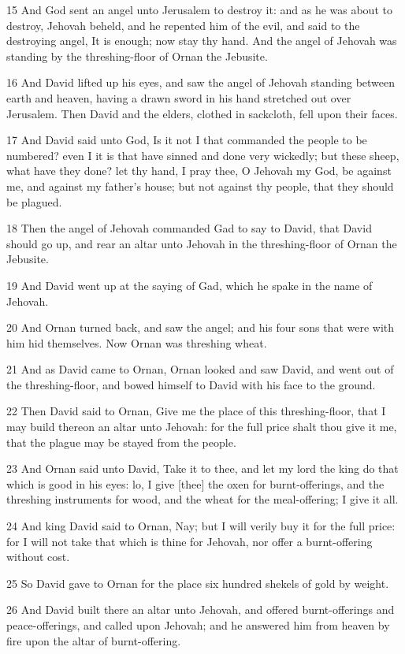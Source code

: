 \par 15 And God sent an angel unto Jerusalem to destroy it: and as he was about to destroy, Jehovah beheld, and he repented him of the evil, and said to the destroying angel, It is enough; now stay thy hand. And the angel of Jehovah was standing by the threshing-floor of Ornan the Jebusite.
\par 16 And David lifted up his eyes, and saw the angel of Jehovah standing between earth and heaven, having a drawn sword in his hand stretched out over Jerusalem. Then David and the elders, clothed in sackcloth, fell upon their faces.
\par 17 And David said unto God, Is it not I that commanded the people to be numbered? even I it is that have sinned and done very wickedly; but these sheep, what have they done? let thy hand, I pray thee, O Jehovah my God, be against me, and against my father's house; but not against thy people, that they should be plagued.
\par 18 Then the angel of Jehovah commanded Gad to say to David, that David should go up, and rear an altar unto Jehovah in the threshing-floor of Ornan the Jebusite.
\par 19 And David went up at the saying of Gad, which he spake in the name of Jehovah.
\par 20 And Ornan turned back, and saw the angel; and his four sons that were with him hid themselves. Now Ornan was threshing wheat.
\par 21 And as David came to Ornan, Ornan looked and saw David, and went out of the threshing-floor, and bowed himself to David with his face to the ground.
\par 22 Then David said to Ornan, Give me the place of this threshing-floor, that I may build thereon an altar unto Jehovah: for the full price shalt thou give it me, that the plague may be stayed from the people.
\par 23 And Ornan said unto David, Take it to thee, and let my lord the king do that which is good in his eyes: lo, I give [thee] the oxen for burnt-offerings, and the threshing instruments for wood, and the wheat for the meal-offering; I give it all.
\par 24 And king David said to Ornan, Nay; but I will verily buy it for the full price: for I will not take that which is thine for Jehovah, nor offer a burnt-offering without cost.
\par 25 So David gave to Ornan for the place six hundred shekels of gold by weight.
\par 26 And David built there an altar unto Jehovah, and offered burnt-offerings and peace-offerings, and called upon Jehovah; and he answered him from heaven by fire upon the altar of burnt-offering.
